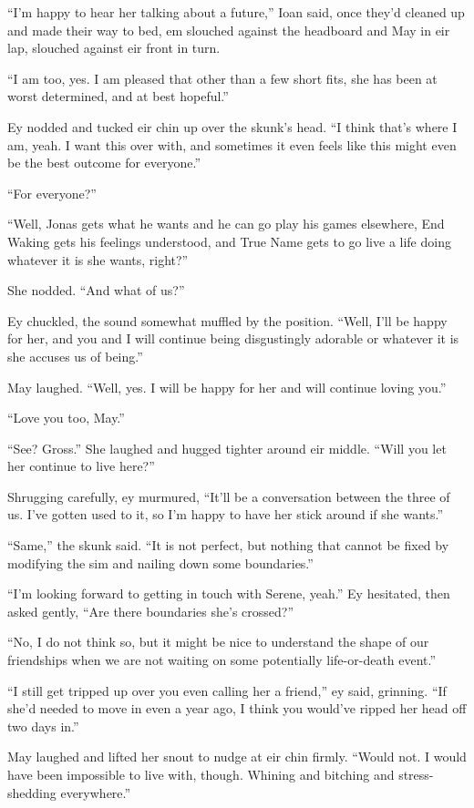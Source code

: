 ``I'm happy to hear her talking about a future,'' Ioan said, once they'd cleaned up and made their way to bed, em slouched against the headboard and May in eir lap, slouched against eir front in turn.

``I am too, yes. I am pleased that other than a few short fits, she has been at worst determined, and at best hopeful.''

Ey nodded and tucked eir chin up over the skunk's head. ``I think that's where I am, yeah. I want this over with, and sometimes it even feels like this might even be the best outcome for everyone.''

``For everyone?''

``Well, Jonas gets what he wants and he can go play his games elsewhere, End Waking gets his feelings understood, and True Name gets to go live a life doing whatever it is she wants, right?''

She nodded. ``And what of us?''

Ey chuckled, the sound somewhat muffled by the position. ``Well, I'll be happy for her, and you and I will continue being disgustingly adorable or whatever it is she accuses us of being.''

May laughed. ``Well, yes. I will be happy for her and will continue loving you.''

``Love you too, May.''

``See? Gross.'' She laughed and hugged tighter around eir middle. ``Will you let her continue to live here?''

Shrugging carefully, ey murmured, ``It'll be a conversation between the three of us. I've gotten used to it, so I'm happy to have her stick around if she wants.''

``Same,'' the skunk said. ``It is not perfect, but nothing that cannot be fixed by modifying the sim and nailing down some boundaries.''

``I'm looking forward to getting in touch with Serene, yeah.'' Ey hesitated, then asked gently, ``Are there boundaries she's crossed?''

``No, I do not think so, but it might be nice to understand the shape of our friendships when we are not waiting on some potentially life-or-death event.''

``I still get tripped up over you even calling her a friend,'' ey said, grinning. ``If she'd needed to move in even a year ago, I think you would've ripped her head off two days in.''

May laughed and lifted her snout to nudge at eir chin firmly. ``Would not. I would have been impossible to live with, though. Whining and bitching and stress-shedding everywhere.''

